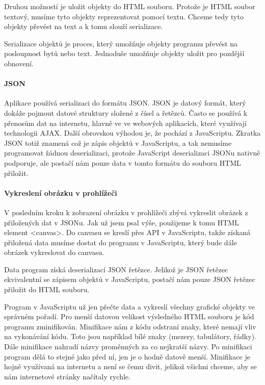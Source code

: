 \documentclass[
  field=inf,
  biblatex,
  glossaries,
  index
]{kidiplom}
\begin{document}
Druhou možností je uložit objekty do HTML souboru. Protože je HTML soubor textový, musíme tyto objekty reprezentovat pomocí textu. Chceme tedy tyto objekty převést na text a k tomu slouží serializace.

Serializace objektů je proces, který umožňuje objekty programu převést na posloupnost bytů nebo text. Jednoduše umožňuje objekty uložit pro pozdější obnovení.



\paragraph{JSON}
Aplikace používá serializaci do formátu JSON. JSON je datový formát, který dokáže pojmout datové struktury složené z čísel a řetězců. Často se používá k přenosům dat na internetu, hlavně ve ve webových aplikacích, které využívají technologii AJAX. Další obrovskou výhodou je, že pochází z JavaScriptu. Zkratka JSON totiž znamená  což je zápis objektů v JavaScriptu, a tak nemusíme programovat žádnou deserializaci, protože JavaScript deserializaci JSONu nativně podporuje, ale postačí nám pouze data v tomto formátu do souboru HTML přiložit.


\paragraph{Vykreslení obrázku v prohlížeči}
V posledním kroku k zobrazení obrázku v prohlížeči zbývá vykreslit obrázek z přiložených dat v JSONu. Jak už jsem psal výše, použijeme k tomu HTML element <canvas>. Do canvasu se kreslí přes API v JavaScriptu, takže získaná přiložená data musíme dostat do programu v JavaScriptu, který bude dále obrázek vykreslovat do canvasu. 

Data program získá deserializací JSON řetězce. Jelikož je JSON řetězec ekvivalentní se zápisem objektů v JavaScriptu, postačí nám pouze JSON řetězec přiložit do HTML souboru.

Program v JavaScriptu už jen přečte data a vykreslí všechny grafické objekty ve správném pořadí. Pro menší datovou velikost výsledného HTML souboru je kód programu zminifikován. Minifikace nám z kódu odstraní znaky, které nemají vliv na vykonávání kódu. Toto jsou například bílé znaky (mezery, tabulátory, řádky). Dále minifikace nahradí názvy proměnných za co nejkratší názvy. Po minifikaci program dělá to stejné jako před ní, jen je o hodně datově menší. Minifikace je hojně využívaná na internetu a není se čemu divit, jelikož všichni chceme, aby se nám internetové stránky načítaly rychle.
\end{document}
